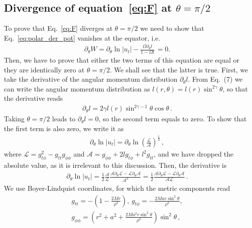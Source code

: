 \documentclass[referee]{aa}
\begin{document}
\begin{appendix}
\section{Divergence of equation~\eqref{eq:F} at $\theta = \pi/2$}\label{div_partial_W}
To prove that Eq.~\eqref{eq:F} diverges at $\theta = \pi/2$ we need to show that
Eq.~\eqref{eq:polar_der_pot} vanishes at the equator, i.e.
\begin{eqnarray}
\partial_{\theta} W = \partial_{\theta} \ln|u_t| - \frac{\Omega \partial_{\theta}l}{1 - \Omega l}\, = 0.
\end{eqnarray}
Then, we have to prove that either the two terms of this equation are equal or they are identically zero at $\theta = \pi/2$. We shall see that the latter is true.
First, we take the derivative of the angular momentum distribution $\partial_{\theta} l$. From Eq.~(7) we can write the angular momentum distribution as $l(r, \theta) = l(r) \sin^{2\gamma} \theta$, so that the derivative reads
\begin{eqnarray}
\partial_{\theta} l = 2\gamma l(r) \sin^{2\gamma - 1} \theta \cos \theta \,.
\end{eqnarray}
Taking $\theta = \pi/2$ leads to $\partial_{\theta} l = 0$, so the second term equals to zero.
To show that the first term is also zero, we write it as
\begin{eqnarray}
\partial_{\theta} \ln|u_t| = \partial_{\theta} \ln \left(\frac{\mathcal{L}}{\mathcal{A}}\right)^{\frac{1}{2}}\,,
\end{eqnarray}
where $\mathcal{L} = g_{t \phi}^2 - g_{tt} g_{\phi\phi}$ and $\mathcal{A} = g_{\phi\phi} + 2 l g_{t\phi} + l^2g_{tt}$, and we have dropped the absolute value, as it is irrelevant to this discussion. Then, the derivative is
\begin{eqnarray}
\partial_{\theta} \ln|u_t| = \frac{1}{2} \frac{\mathcal{A}}{\mathcal{L}}\frac{\mathcal{A}\partial_{\theta}{\mathcal{L}} - \mathcal{L}\partial_{\theta}\mathcal{A}}{\mathcal{A}^2} = \frac{1}{2} \frac{\mathcal{A}\partial_{\theta}{\mathcal{L}} - \mathcal{L}\partial_{\theta}\mathcal{A}}{\mathcal{A} \mathcal{L}}\,.
\end{eqnarray}
We use Boyer-Lindquist coordinates, for which the metric components read
\begin{eqnarray}
g_{tt} = - \left(1 - \frac{2Mr}{\rho^2}\right), \ g_{t\phi} = -\frac{2Mar\sin^2\theta}{\rho^2},
\nonumber \\
g_{\phi\phi} = \left(r^2 + a^2 + \frac{2Ma^2r\sin^2\theta}{\rho^2}\right) \sin^2 \theta\,,

\end{eqnarray}
\end{appendix}
\end{document}
